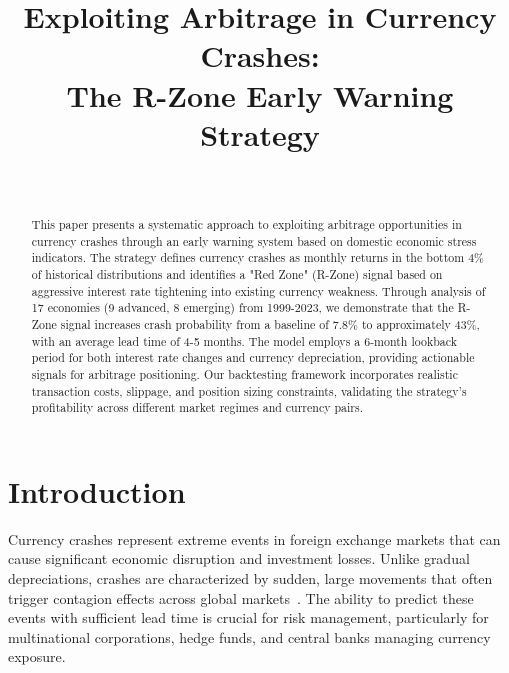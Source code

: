 \documentclass[twocolumn,ieee]{arithmaxresearch}
\begin{document}
\title{Exploiting Arbitrage in Currency Crashes:\\
The R-Zone Early Warning Strategy}

\author{
\\
\vspace{0.5em}
}

\maketitle

\begin{center}
\vspace{-1em}
\arithmaxtitlelogo[4cm]
\vspace{0.5em}
\end{center}

\begin{abstract}
This paper presents a systematic approach to exploiting arbitrage opportunities in currency crashes through an early warning system based on domestic economic stress indicators. The strategy defines currency crashes as monthly returns in the bottom 4\% of historical distributions and identifies a "Red Zone" (R-Zone) signal based on aggressive interest rate tightening into existing currency weakness. Through analysis of 17 economies (9 advanced, 8 emerging) from 1999-2023, we demonstrate that the R-Zone signal increases crash probability from a baseline of 7.8\% to approximately 43\%, with an average lead time of 4-5 months. The model employs a 6-month lookback period for both interest rate changes and currency depreciation, providing actionable signals for arbitrage positioning. Our backtesting framework incorporates realistic transaction costs, slippage, and position sizing constraints, validating the strategy's profitability across different market regimes and currency pairs.
\end{abstract}

\section{Introduction}

Currency crashes represent extreme events in foreign exchange markets that can cause significant economic disruption and investment losses. Unlike gradual depreciations, crashes are characterized by sudden, large movements that often trigger contagion effects across global markets~\cite{forbes2002crash}. The ability to predict these events with sufficient lead time is crucial for risk management, particularly for multinational corporations, hedge funds, and central banks managing currency exposure.
\end{document}
